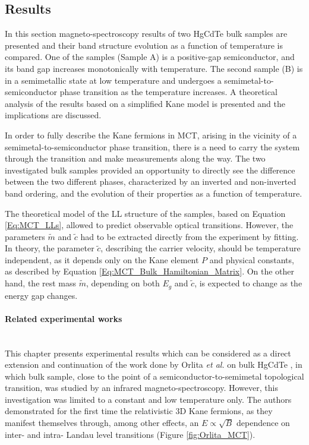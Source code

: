 \documentclass[titlepage,a4paper]{book}
\newcommand{\wciecie}{\quad\phantom{v}}
\newcommand{\myparagraph}[1]{\paragraph{#1}\mbox{}\\}
\begin{document}
\subsection{Results}
\label{sec:MCT_bulk}
\wciecie
In this section magneto-spectroscopy results of two HgCdTe bulk samples are presented and their band structure evolution as a function of temperature is compared. One of the samples (Sample A) is a positive-gap semiconductor, and its band gap increases monotonically with temperature. The second sample (B) is in a semimetallic state at low temperature and undergoes a semimetal-to-semiconductor phase transition as the temperature increases. A theoretical analysis of the results based on a simplified Kane model is presented and the implications are discussed.

In order to fully describe the Kane fermions in MCT, arising in the vicinity of a semimetal-to-semiconductor phase transition, there is a need to carry the system through the transition and make measurements along the way. The two investigated bulk samples provided an opportunity to directly see the difference between the two different phases, characterized by an inverted and non-inverted band ordering, and the evolution of their properties as a function of temperature.  

The theoretical model of the LL structure of the samples, based on Equation \ref{Eq:MCT_LLs}, allowed to predict observable optical transitions. However, the parameters $\tilde{m}$ and $\tilde c$ had to be extracted directly from the experiment by fitting. In theory, the parameter $\tilde c$, describing the carrier velocity, should be temperature independent, as it depends only on the Kane element $P$ and physical constants, as described by Equation \ref{Eq:MCT_Bulk_Hamiltonian_Matrix}. On the other hand, the rest mass $\tilde{m}$, depending on both $E_g$ and $\tilde{c}$, is expected to change as the energy gap changes.

\myparagraph{Related experimental works}
\wciecie
This chapter presents experimental results which can be considered as a direct extension and continuation of the work done by Orlita \textit{et al.} on bulk HgCdTe \cite{Orlita_MCT}, in which bulk sample, close to the point of a semiconductor-to-semimetal topological transition, was studied by an infrared magneto-spectroscopy. However, this investigation was limited to a constant and low temperature only. The authors demonstrated for the first time the relativistic 3D Kane fermions, as they manifest themselves through, among other effects, an $E \propto \sqrt{B}$ dependence on inter- and intra- Landau level transitions (Figure \ref{fig:Orlita_MCT}). 
\end{document}

